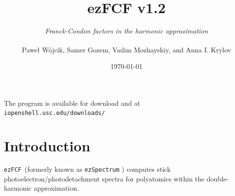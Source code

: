 \documentclass[11pt]{article}
\begin{document}
\newcommand{\ezS}{\texttt{ezSpectrum} }
\newcommand{\ezFCF}{\texttt{ezFCF}}
\newcommand{\ezSnospace}{\texttt{ezSpectrum}}
\newcommand{\ai}{\textit{ab initio} }
\newcommand{\abinitio}{\textit{ab initio}}
\newcommand{\xml}{\texttt{xml} }

\newcommand{\ul}[2]{\texttt{#1{\underline{~}#2}} } %

\newcommand{\ket}[1]{|#1\rangle}      %
\newcommand{\bra}[1]{\langle #1|}     %
\newcommand{\braket}[2]{\langle #1|#2\rangle}      %



\title{ezFCF v1.2}
\author{{\em Franck-Condon factors in the harmonic approximation}\\ 
  \vspace{20mm}\\
Pawe\l{} W{\'o}jcik,  Samer Gozem, Vadim Mozhayskiy, and Anna I. Krylov\\ \vspace{20mm}}
\date{\today}
\maketitle

\thispagestyle{empty}

\begin{center}
\vspace{30mm}
\normalsize{The program is available for download and at\\ 
\texttt{iopenshell.usc.edu/downloads/} }
\end{center}

\clearpage
\thispagestyle{empty}

\tableofcontents


\clearpage

  
\section*{Introduction}

\ezFCF\ (formerly known as \ezS) computes stick photoelectron/photodetachment spectra for polyatomics 
within the double-harmonic approximation. 
\end{document}
